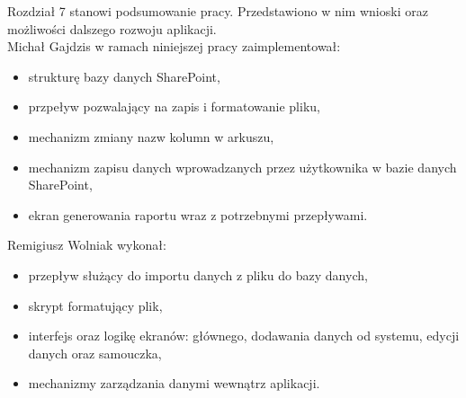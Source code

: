 \noindent Rozdział 7 stanowi podsumowanie pracy. Przedstawiono w nim wnioski oraz możliwości dalszego rozwoju aplikacji.\\

\vspace{0.5cm}
\noindent Michał Gajdzis w ramach niniejszej pracy zaimplementował:
\begin{itemize}
    \item strukturę bazy danych SharePoint,
    \item przpeływ pozwalający na zapis i formatowanie pliku,
    \item mechanizm zmiany nazw kolumn w arkuszu,
    \item mechanizm zapisu danych wprowadzanych przez użytkownika w bazie danych SharePoint,
    \item ekran generowania raportu wraz z potrzebnymi przepływami.
\end{itemize}

\vspace{0.5cm}
\noindent Remigiusz Wolniak wykonał:
\begin{itemize}
\item przepływ służący do importu danych z pliku do bazy danych,
\item skrypt formatujący plik,
\item interfejs oraz logikę ekranów: głównego, dodawania danych od systemu, edycji danych oraz samouczka,
\item mechanizmy zarządzania danymi wewnątrz aplikacji.
\end{itemize}